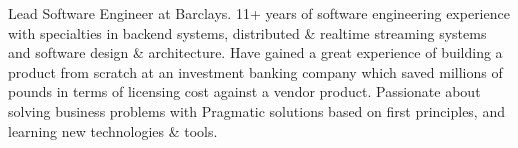 

\begin{cvparagraph}

Lead Software Engineer at Barclays. 11+ years of software engineering experience with specialties in backend systems, distributed \& realtime streaming systems and software design \& architecture. Have gained a great experience of building a product from scratch at an investment banking company which saved millions of pounds in terms of licensing cost against a vendor product. Passionate about solving business problems with Pragmatic solutions based on first principles, and learning new technologies \& tools.
\end{cvparagraph}

